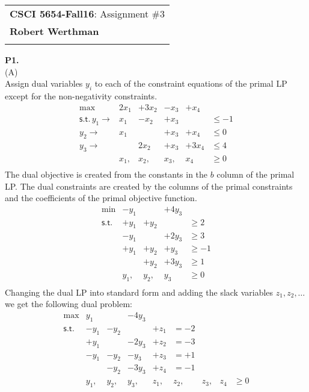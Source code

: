 \documentclass[11pt]{article}
\begin{document}
\begin{tabular}{l}
\textbf{CSCI 5654-Fall16}: Assignment \#3 \\
\textbf{Robert Werthman} \phantom{Supercalifragilisticexpialidocius Smith}\\
\hline
\\[10pt]
\end{tabular}

\noindent
\textbf{P1.}
\\
\noindent (A)
\\
Assign dual variables $y_i$ to each of the constraint equations of the primal LP except for the non-negativity constraints.
\[ \begin{array}{rllllll}
\max & 2 x_1  & + 3 x_2 & - x_3 & + x_4 \\
\mathsf{s.t.}\, y_1 \rightarrow & x_1 & - x_2 & + x_3 &   & \leq  -1 \\
y_2 \rightarrow & x_1 &  & + x_3 & + x_4 & \leq 0 \\
y_3 \rightarrow &    & 2 x_2 & + x_3 & + 3 x_4 & \leq  4 \\
& x_1, & x_2, & x_3, & x_4 & \geq  0 \\
\end{array}\]
The dual objective is created from the constants in the $b$ column of the primal LP.  The dual constraints are created by the columns of the primal constraints and the coefficients of the primal objective function.
\[\begin{array}{rllllll}
\min & -y_1 & & +4y_3 \\
\mathsf{s.t.} 
& +y_1 & +y_2 & & \geq 2 \\
& -y_1 & & +2y_3 & \geq 3 \\
& +y_1 & +y_2 & +y_3 & \geq -1 \\
& & +y_2 & +3y_3 & \geq 1 \\
& y_1, & y_2, & y_3 & \geq 0 \\
\end{array}\]
Changing the dual LP into standard form and adding the slack variables $z_1, z_2, \ldots$ we get the following dual problem:
\[\begin{array}{rllllllll}
\max & y_1 & & -4y_3 \\
\mathsf{s.t.} 
& -y_1 & -y_2 & & +z_1 & = -2 \\
& +y_1 & & -2y_3 & +z_2 & = -3 \\
& -y_1 & -y_2 & -y_3 & +z_3 & = +1 \\
& & -y_2 & -3y_3 & +z_4 & = -1 \\
& y_1, & y_2, & y_3, & z_1, & z_2, & z_3, & z_4 & \geq 0 \\
\end{array}\]
\end{document}
